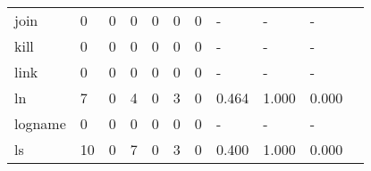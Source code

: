 \begin{longtable}{lp{1.2cm}p{1.2cm}p{1.2cm}p{1.2cm}p{1.2cm}p{1.2cm}p{1.2cm}p{1.2cm}p{1.2cm}p{1.2cm}}
join      &                                     0 &                                                  0 &                                                0 &                                               0 &                                                0 &                                              0 &                                             - &                                                  - &                                                  - \\
kill      &                                     0 &                                                  0 &                                                0 &                                               0 &                                                0 &                                              0 &                                             - &                                                  - &                                                  - \\
link      &                                     0 &                                                  0 &                                                0 &                                               0 &                                                0 &                                              0 &                                             - &                                                  - &                                                  - \\
ln        &                                     7 &                                                  0 &                                                4 &                                               0 &                                                3 &                                              0 &                                         0.464 &                                              1.000 &                                              0.000 \\
logname   &                                     0 &                                                  0 &                                                0 &                                               0 &                                                0 &                                              0 &                                             - &                                                  - &                                                  - \\
ls        &                                    10 &                                                  0 &                                                7 &                                               0 &                                                3 &                                              0 &                                         0.400 &                                              1.000 &                                              0.000 \\

\end{longtable}
